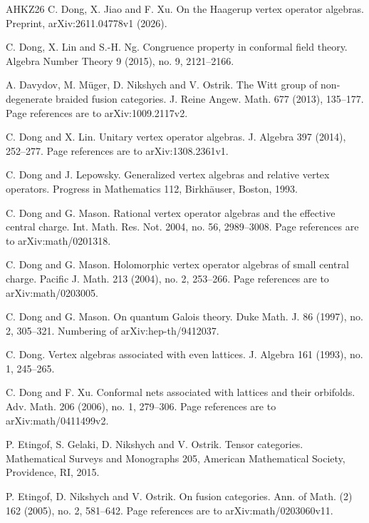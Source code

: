 \documentclass[leqno]{article}
\numberwithin{equation}{section}
\begin{document}
\begin{thebibliography}{AHKZ26}
C. Dong, X. Jiao and F. Xu.
\newblock On the Haagerup vertex operator algebras.
\newblock Preprint, arXiv:2611.04778v1 (2026).

C. Dong, X. Lin and S.-H. Ng.
\newblock Congruence property in conformal field theory.
\newblock Algebra Number Theory 9 (2015), no. 9, 2121--2166.

A. Davydov, M. Müger, D. Nikshych and V. Ostrik.
\newblock The Witt group of non-degenerate braided fusion categories.
\newblock J. Reine Angew. Math. 677 (2013), 135--177. Page references are to arXiv:1009.2117v2.

C. Dong and X. Lin.
\newblock Unitary vertex operator algebras.
\newblock J. Algebra 397 (2014), 252--277. Page references are to arXiv:1308.2361v1.

C. Dong and J. Lepowsky.
\newblock Generalized vertex algebras and relative vertex operators.
\newblock Progress in Mathematics 112, Birkh\"auser, Boston, 1993.

C. Dong and G. Mason.
\newblock Rational vertex operator algebras and the effective central charge.
\newblock Int. Math. Res. Not. 2004, no. 56, 2989--3008. Page references are to arXiv:math/0201318.

C. Dong and G. Mason.
\newblock Holomorphic vertex operator algebras of small central charge.
\newblock Pacific J. Math. 213 (2004), no. 2, 253--266. Page references are to arXiv:math/0203005.

C. Dong and G. Mason.
\newblock On quantum Galois theory.
\newblock Duke Math. J. 86 (1997), no. 2, 305--321. Numbering of arXiv:hep-th/9412037.

C. Dong.
\newblock Vertex algebras associated with even lattices.
\newblock J. Algebra 161 (1993), no. 1, 245--265.

C. Dong and F. Xu.
\newblock Conformal nets associated with lattices and their orbifolds.
\newblock Adv. Math. 206 (2006), no. 1, 279--306. Page references are to arXiv:math/0411499v2.

P. Etingof, S. Gelaki, D. Nikshych and V. Ostrik.
\newblock Tensor categories.
\newblock Mathematical Surveys and Monographs 205, American Mathematical Society, Providence, RI, 2015.

P. Etingof, D. Nikshych and V. Ostrik.
\newblock On fusion categories.
\newblock Ann. of Math. (2) 162 (2005), no. 2, 581--642. Page references are to arXiv:math/0203060v11.


\end{thebibliography}
\end{document}
